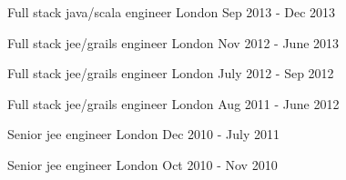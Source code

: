 \begin{cventries}
    \cventry
    {Full stack java/scala engineer}
    {}
    {London}
    {Sep 2013 - Dec 2013}
    {}
    {}

    \cventry
    {Full stack jee/grails engineer}
    {}
    {London}
    {Nov 2012 - June 2013}
    {}
    {}

    \cventry
    {Full stack jee/grails engineer}
    {}
    {London}
    {July 2012 - Sep 2012}
    {}
    {}

    \cventry
    {Full stack jee/grails engineer}
    {}
    {London}
    {Aug 2011 - June 2012}
    {}
    {}

    \cventry
    {Senior jee engineer}
    {}
    {London}
    {Dec 2010 - July 2011}
    {}
    {}

    \cventry
    {Senior jee engineer}
    {}
    {London}
    {Oct 2010 - Nov 2010}
    {}
    {}
\end{cventries}



